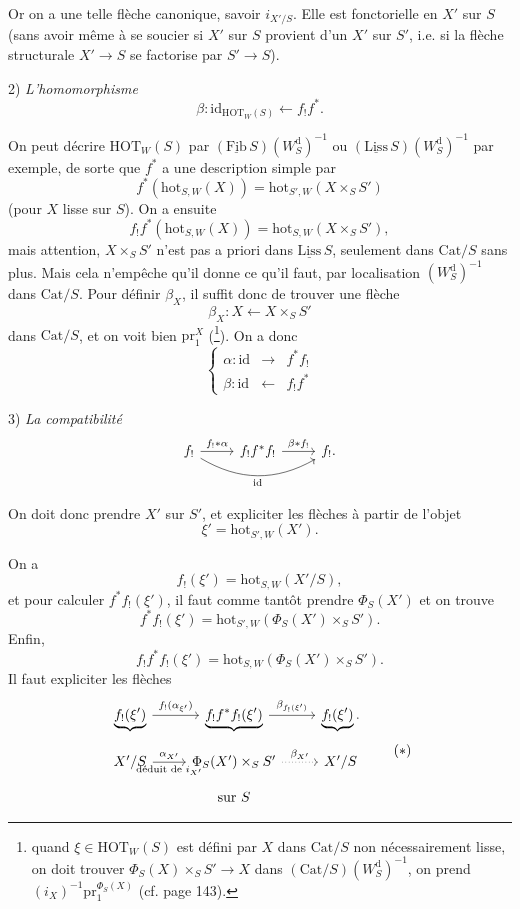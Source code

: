 \documentclass[11pt]{article}
\newcommand{\printedpage}[1]{\marginpar{\footnotesize p.~#1}}
\newcommand{\msp}[1]{\marginpar{\footnotesize [#1]}}
\newcommand{\HOT}{\mathrm{HOT}}
\newcommand{\hot}{\mathrm{hot}}
\newcommand{\Cat}{\mathrm{Cat}}
\newcommand{\id}{\mathrm{id}}
\newcommand{\pr}{\mathrm{pr}}
\newcommand{\Wd}{W^{\mathrm{d}}}
\begin{document}
\printedpage{85}
Or on a une telle flèche canonique, savoir $i_{X'/S}$. Elle est fonctorielle en $X'$ sur $S$ (sans avoir même à se soucier si $X'$ sur $S$ provient d'un $X'$ sur $S'$, i.e. si la flèche structurale $X'\longrightarrow S$ se factorise par $S'\longrightarrow S$).

\leavevmode\msp{page 140}2) \textit{L'homomorphisme}
\[
\beta : \id_{\HOT_W(S)} \longleftarrow f_!f^*.
\]

On peut décrire $\HOT_W(S)$ par $(\underline{\mathrm{Fib}}\,S)(\Wd_S)^{-1}$ ou $(\underline{\mathrm{Liss}}\,S)(\Wd_S)^{-1}$ par exemple, de sorte que $f^*$ a une description simple par
\[
f^*(\hot_{S,W}(X)) = \hot_{S',W}(X\times_S S')
\]
(pour $X$ lisse sur $S$). On a ensuite
\[
f_!f^*(\hot_{S,W}(X)) = \hot_{S,W}(X\times_S S'),
\]
mais attention, $X\times_S S'$ n'est pas a priori dans $\underline{\mathrm{Liss}}\,S$, seulement dans $\Cat/S$ sans plus. Mais cela n'empêche qu'il donne ce qu'il faut, par localisation $(\Wd_S)^{-1}$ dans $\Cat/S$. Pour définir $\beta_X$, il suffit donc de trouver une flèche
\[
\beta_X : X \longleftarrow X\times_S S'
\]
dans $\Cat/S$, et on voit bien $\pr_1^X$ (\footnote[68]{quand $\xi\in\HOT_W(S)$ est défini par $X$ dans $\Cat/S$ non nécessairement lisse, on doit trouver $\Phi_S(X)\times_S S'\longrightarrow X$ dans $(\Cat/S)(\Wd_S)^{-1}$, on prend $(i_X)^{-1}\pr_1^{\Phi_S(X)}$ (cf. page 143).}). On a donc
\[
\left\{
\begin{array}{lcl}
\alpha : \id & \longrightarrow & f^*f_! \\
\beta : \id & \longleftarrow & f_!f^*
\end{array}
\right.
\]

3) \textit{La compatibilité}
\[
\begin{tikzcd}
f_! \arrow[r, "f_!*\alpha"] \arrow[rr, bend right, "\id"'] & f_!f^*f_! \arrow[r, "\beta*f_!"] & f_!.
\end{tikzcd}
\]

On doit donc prendre $X'$ sur $S'$, et expliciter les flèches à partir de l'objet
\[
\xi' = \hot_{S',W}(X').
\]

\printedpage{86}
\leavevmode\msp{page 141}On a
\[
f_!(\xi') = \hot_{S,W}(X'/S),
\]
et pour calculer $f^*f_!(\xi')$, il faut comme tantôt prendre $\Phi_S(X')$ et on trouve
\[
f^*f_!(\xi') = \hot_{S',W}(\Phi_S(X')\times_S S').
\]
Enfin,
\[
f_!f^*f_!(\xi') = \hot_{S,W}(\Phi_S(X')\times_S S').
\]
Il faut expliciter les flèches
\[
\begin{tikzcd}[row sep=small]
\underbrace{f_!(\xi')} \arrow[r, "{f_!(\alpha_{\xi'})}"] & \underbrace{f_!f^*f_!(\xi')} \arrow[r, "{\beta_{f_!(\xi')}}"] & \underbrace{f_!(\xi')}. \\
X'/S \arrow[r, "{\alpha_{X'}}", "{\text{déduit de } i_{X'}}"'] & \Phi_S(X')\times_S S' \arrow[r, dotted, "{\beta_{X'}}"] & X'/S \\
 & \text{sur } S &
\end{tikzcd}
\tag*{$(*)$}
\]
\end{document}
